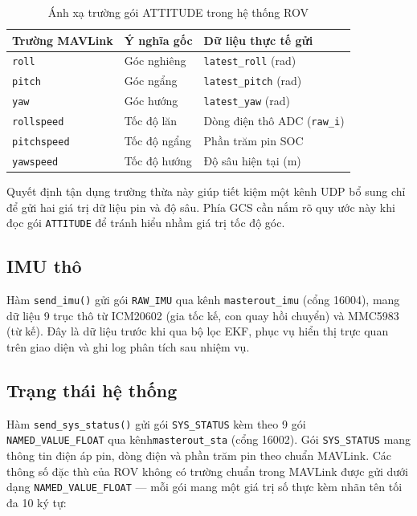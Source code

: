 \documentclass[../DoAn.tex]{subfiles}
\begin{document}
\begin{table}[H]
\centering
\renewcommand{\arraystretch}{1.3}
\begin{tabular}{|l|l|l|}
\hline
\textbf{Trường MAVLink} & \textbf{Ý nghĩa gốc} & \textbf{Dữ liệu thực tế gửi} \\
\hline
\texttt{roll}       & Góc nghiêng       & \texttt{latest\_roll} (rad) \\
\texttt{pitch}      & Góc ngẩng     & \texttt{latest\_pitch} (rad) \\
\texttt{yaw}        & Góc hướng     & \texttt{latest\_yaw} (rad) \\
\texttt{rollspeed}  & Tốc độ lăn   & Dòng điện thô ADC (\texttt{raw\_i}) \\
\texttt{pitchspeed} & Tốc độ ngẩng & Phần trăm pin SOC \\
\texttt{yawspeed}   & Tốc độ hướng & Độ sâu hiện tại (m) \\
\hline
\end{tabular}
\caption{Ánh xạ trường gói ATTITUDE trong hệ thống ROV}
\label{tab:attitude_fields}
\end{table}

Quyết định tận dụng trường thừa này giúp tiết kiệm một kênh UDP bổ
sung chỉ để gửi hai giá trị dữ liệu pin và độ sâu. Phía GCS cần nắm
rõ quy ước này khi đọc gói \texttt{ATTITUDE} để tránh hiểu nhầm giá
trị tốc độ góc.

\subsection{IMU thô}

Hàm \texttt{send\_imu()} gửi gói \texttt{RAW\_IMU} qua kênh
\texttt{masterout\_imu} (cổng 16004), mang dữ liệu 9 trục thô từ
ICM20602 (gia tốc kế, con quay hồi chuyển) và MMC5983 (từ kế). Đây
là dữ liệu trước khi qua bộ lọc EKF, phục vụ hiển thị trực quan trên
giao diện và ghi log phân tích sau nhiệm vụ.

\subsection{Trạng thái hệ thống}

Hàm \texttt{send\_sys\_status()} gửi gói \texttt{SYS\_STATUS} kèm
theo 9 gói\\ \texttt{NAMED\_VALUE\_FLOAT} qua kênh\texttt{masterout\_sta}
(cổng 16002). Gói \texttt{SYS\_STATUS} mang thông tin điện áp pin,
dòng điện và phần trăm pin theo chuẩn MAVLink. Các thông số đặc thù
của ROV không có trường chuẩn trong MAVLink được gửi dưới dạng
\texttt{NAMED\_VALUE\_FLOAT} --- mỗi gói mang một giá trị số thực
kèm nhãn tên tối đa 10 ký tự:
\end{document}
